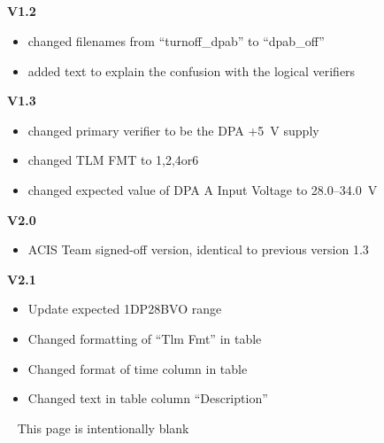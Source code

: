 \documentclass[11pt]{article}
\begin{document}
\normalsize
{} \\
\normalsize


\normalsize
{} \\
\normalsize



\vspace{0.15in}
\normalsize
{} \\
\normalsize

\normalsize
{} \\
\normalsize

{\bf V1.2}
\begin{itemize}
\item changed filenames from ``turnoff\_dpab'' to
``dpab\_off''
\item added text to explain the confusion with the logical verifiers
\end{itemize}

{\bf V1.3}
\begin{itemize}
\item changed primary verifier to be the DPA +5~V supply
\item changed TLM FMT to 1,2,4or6
\item changed expected value of DPA A Input Voltage to 28.0--34.0~V
\end{itemize}

{\bf V2.0}
\begin{itemize}
\item ACIS Team signed-off version, identical to previous version 1.3
\end{itemize}

{\bf V2.1}
\begin{itemize}
\item Update expected 1DP28BVO range
\item Changed formatting of ``Tlm Fmt'' in table
\item Changed format of time column in table
\item Changed text in table column ``Description''
\end{itemize}

\newpage\
\vspace{0.4\textheight}
\bc This page is intentionally blank \ec

\newcommand{\tablecaptiontext}{TURN OFF DPA B (realtime version)}

\end{document}
